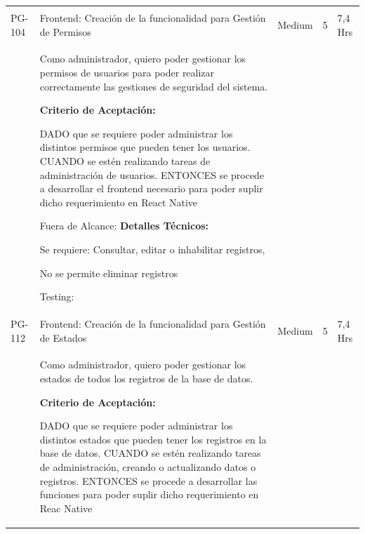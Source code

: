 \documentclass[11pt]{charter}
\begin{document}
\begin{landscape}
\begin{tabularx}{\linewidth}{@{}|p{1.3cm}|p{17cm}|p{1.7cm}|p{1.5cm}|p{1.7cm}|@{}}
\begin{description}
            \end{description}      &  &     & \\
PG-104   & Frontend: Creación de la   funcionalidad para Gestión de Permisos  & Medium             & 5   & 7,4  Hrs          \\
         &  \begin{description}                 
                   \item Como administrador, quiero poder   gestionar los permisos de usuarios para poder realizar correctamente las   gestiones de seguridad del sistema.                 
                   \item \textbf{Criterio de Aceptación:}                 
                   \item DADO que se requiere poder administrar los distintos permisos que pueden   tener los usuarios. CUANDO se estén realizando tareas de administración de usuarios. ENTONCES se procede a desarrollar el frontend necesario para poder suplir dicho requerimiento en React Native             
                   \item Fuera de Alcance:                 
                   \textbf{Detalles Técnicos:} 
                         \item Se requiere: Consultar, editar o inhabilitar registros, 
                         \item No se permite eliminar registros                 
                   \item Testing:
            \end{description}                 &  &     & \\
PG-112   & Frontend: Creación de la   funcionalidad para Gestión de Estados   & Medium             & 5   & 7,4  Hrs          \\
         &  \begin{description}                 
                   \item Como administrador, quiero poder   gestionar los estados de todos los registros de la base de datos.                 
                   \item \textbf{Criterio de Aceptación:}                 
                   \item DADO que se requiere poder administrar los distintos estados que pueden   tener los registros en la base de datos. CUANDO se estén realizando tareas de administración, creando o actualizando   datos o registros. ENTONCES se procede a desarrollar las funciones para poder suplir dicho   requerimiento en Reac Native             

\end{description}
\end{tabularx}
\end{landscape}
\end{document}
